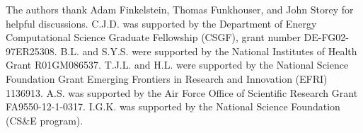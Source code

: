 \documentclass{pnastwo}
\begin{document}
\begin{article}
\begin{materials}
\end{materials}




\begin{acknowledgments}
The authors thank Adam Finkelstein,  Thomas Funkhouser, and John Storey for helpful discussions. 
%
C.J.D. was supported by the Department of Energy Computational Science Graduate Fellowship (CSGF), grant number DE-FG02-97ER25308.
%
B.L. and S.Y.S. were supported by the National Institutes of Health Grant R01GM086537. 
%
T.J.L. and H.L. were supported by the National Science Foundation Grant Emerging Frontiers in Research and Innovation (EFRI) 1136913.
%
A.S. was supported by the Air Force Office of Scientific Research Grant
FA9550-12-1-0317.
%
I.G.K. was supported by the National Science Foundation (CS\&E program).
\end{acknowledgments}






%
%


\end{article}
\end{document}
